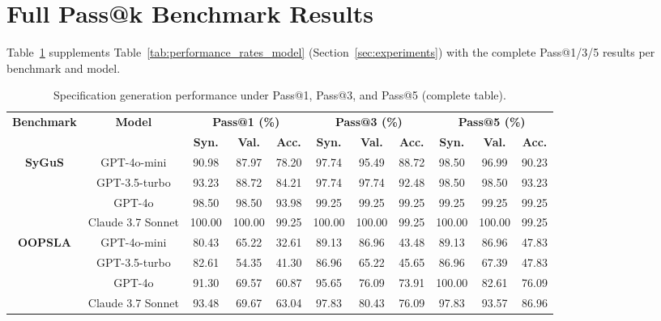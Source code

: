 \section{Full Pass@k Benchmark Results}
\label{app:rq2-full}

Table~\ref{tab:performance_rates_model_full} supplements Table~\ref{tab:performance_rates_model} (Section~\ref{sec:experiments}) with the complete Pass@1/3/5 results per benchmark and model.

\begin{table}[t]
\centering
\caption{Specification generation performance under Pass@1, Pass@3, and Pass@5 (complete table).}
\label{tab:performance_rates_model_full}

\setlength{\tabcolsep}{2pt}
\begin{adjustbox}{max width=\textwidth}
\begin{tabular}{cc ccc ccc ccc}
\toprule
\multirow{2}{*}{\textbf{Benchmark}} & \multirow{2}{*}{\textbf{Model}}
& \multicolumn{3}{c}{\textbf{Pass@1 (\%)}}
& \multicolumn{3}{c}{\textbf{Pass@3 (\%)}}
& \multicolumn{3}{c}{\textbf{Pass@5 (\%)}} \\
\cmidrule(lr){3-5} \cmidrule(lr){6-8} \cmidrule(lr){9-11}
& & \textbf{Syn.} & \textbf{Val.} & \textbf{Acc.}
& \textbf{Syn.} & \textbf{Val.} & \textbf{Acc.}
& \textbf{Syn.} & \textbf{Val.} & \textbf{Acc.} \\
\midrule

\multirow{4}{*}{\textbf{SyGuS}}
 & GPT-4o-mini & 90.98 & 87.97 & 78.20 & 97.74 & 95.49 & 88.72 & 98.50 & 96.99 & 90.23 \\
 & GPT-3.5-turbo & 93.23 & 88.72 & 84.21 & 97.74 & 97.74 & 92.48 & 98.50 & 98.50 & 93.23 \\
 & GPT-4o & 98.50 & 98.50 & 93.98 & 99.25 & 99.25 & 99.25 & 99.25 & 99.25 & 99.25 \\
 & Claude 3.7 Sonnet & 100.00 & 100.00 & 99.25 & 100.00 & 100.00 & 99.25 & 100.00 & 100.00 & 99.25 \\
    \midrule

\multirow{4}{*}{\textbf{OOPSLA}}
 & GPT-4o-mini & 80.43 & 65.22 & 32.61 & 89.13 & 86.96 & 43.48 & 89.13 & 86.96 & 47.83 \\
 & GPT-3.5-turbo & 82.61 & 54.35 & 41.30 & 86.96 & 65.22 & 45.65 & 86.96 & 67.39 & 47.83 \\
 & GPT-4o & 91.30 & 69.57 & 60.87 & 95.65 & 76.09 & 73.91 & 100.00 & 82.61 & 76.09 \\
 & Claude 3.7 Sonnet & 93.48 & 69.67 & 63.04 & 97.83 & 80.43 & 76.09 & 97.83 & 93.57 & 86.96 \\
\midrule


\end{tabular}
\end{adjustbox}
\end{table}
